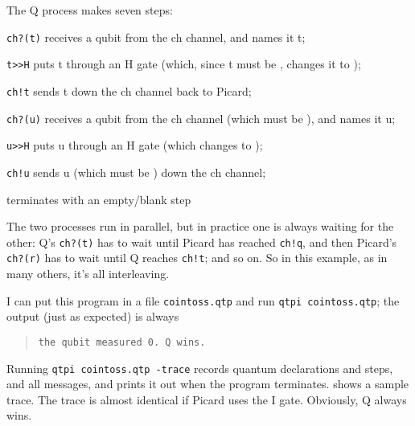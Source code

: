 \documentclass[11pt,a4paper]{book}
\newcommand{\verbtt}[1]{\texttt{\small{}#1}}
\begin{document}
The Q process makes seven steps: 
\renewcommand{\labelenumi}{Q\theenumi}
\begin{enumerate*}
\item \verbtt{ch?(t)} receives a qubit from the ch channel, and names it t;
\item \verbtt{t>>H} puts t through an H gate (which, since t must be \zero{}, changes it to \plus{}); 
\item \verbtt{ch!t} sends t down the ch channel back to Picard; 
\item \verbtt{ch?(u)} receives a qubit from the ch channel (which must be \plus{}), and names it u;
\item \verbtt{u>>H} puts u through an H gate (which changes \plus{} to \zero{});
\item \verbtt{ch!u} sends u (which must be \zero{}) down the ch channel; 
\item terminates with an empty/blank step
\end{enumerate*}
\renewcommand{\labelenumi}{\theenumi}

The two processes run in parallel, but in practice one is always waiting for the other: Q's \verbtt{ch?(t)} has to wait until Picard has reached \verbtt{ch!q}, and then Picard's \verbtt{ch?(r)} has to wait until Q reaches \verbtt{ch!t}; and so on. So in this example, as in many others, it's all interleaving.

 
I can put this program in a file \verbtt{cointoss.qtp} and run \verbtt{qtpi cointoss.qtp}; the output (just as expected) is always 
\begin{quote}
\verbtt{the qubit measured 0. Q wins.}
\end{quote}
Running \verbtt{qtpi cointoss.qtp -trace} records quantum declarations and steps, and all messages, and prints it out when the program terminates.  shows a sample trace. The trace is almost identical if Picard uses the I gate. Obviously, Q always wins.
\end{document}
